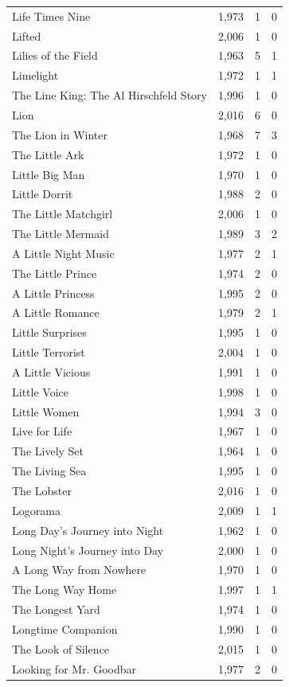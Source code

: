\begin{tabular}{lrrr}
Life Times Nine & 1,973 & 1 & 0 \\
Lifted & 2,006 & 1 & 0 \\
Lilies of the Field & 1,963 & 5 & 1 \\
Limelight & 1,972 & 1 & 1 \\
The Line King: The Al Hirschfeld Story & 1,996 & 1 & 0 \\
Lion & 2,016 & 6 & 0 \\
The Lion in Winter & 1,968 & 7 & 3 \\
The Little Ark & 1,972 & 1 & 0 \\
Little Big Man & 1,970 & 1 & 0 \\
Little Dorrit & 1,988 & 2 & 0 \\
The Little Matchgirl & 2,006 & 1 & 0 \\
The Little Mermaid & 1,989 & 3 & 2 \\
A Little Night Music & 1,977 & 2 & 1 \\
The Little Prince & 1,974 & 2 & 0 \\
A Little Princess & 1,995 & 2 & 0 \\
A Little Romance & 1,979 & 2 & 1 \\
Little Surprises & 1,995 & 1 & 0 \\
Little Terrorist & 2,004 & 1 & 0 \\
A Little Vicious & 1,991 & 1 & 0 \\
Little Voice & 1,998 & 1 & 0 \\
Little Women & 1,994 & 3 & 0 \\
Live for Life & 1,967 & 1 & 0 \\
The Lively Set & 1,964 & 1 & 0 \\
The Living Sea & 1,995 & 1 & 0 \\
The Lobster & 2,016 & 1 & 0 \\
Logorama & 2,009 & 1 & 1 \\
Long Day's Journey into Night & 1,962 & 1 & 0 \\
Long Night's Journey into Day & 2,000 & 1 & 0 \\
A Long Way from Nowhere & 1,970 & 1 & 0 \\
The Long Way Home & 1,997 & 1 & 1 \\
The Longest Yard & 1,974 & 1 & 0 \\
Longtime Companion & 1,990 & 1 & 0 \\
The Look of Silence & 2,015 & 1 & 0 \\
Looking for Mr. Goodbar & 1,977 & 2 & 0 \\

\end{tabular}
